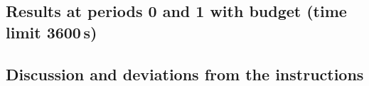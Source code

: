 \subsection{Results at periods 0 and 1 with budget (time limit 3600\,s)}
\begin{table}[h]\centering\scriptsize
\resizebox{\linewidth}{!}{}
\caption{Periods 0 and 1 with the budget constraint. Same conventions as Table~\ref{tab:p0}.}
\label{tab:p01}
\end{table}

\subsection{Discussion and deviations from the instructions}
